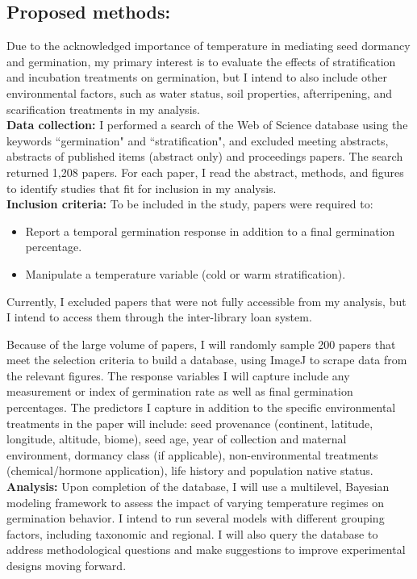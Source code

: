 \documentclass[12pt]{article}\usepackage[]{graphicx}\usepackage[]{color}
\begin{document}
\subsection*{Proposed methods:}
\indent\indent Due to the acknowledged importance of temperature in mediating seed dormancy and germination, my primary interest is to evaluate the effects of stratification and incubation treatments on germination, but I intend to also include other environmental factors, such as water status, soil properties, afterripening, and scarification treatments in my analysis.\\
\indent\textbf{Data collection:} I performed a search of the Web of Science database using the keywords ``germination" and ``stratification", and excluded meeting abstracts, abstracts of published items (abstract only) and proceedings papers. The search returned 1,208 papers. For each paper, I read the abstract, methods, and figures to identify studies that fit for inclusion in my analysis.\\
\indent\textbf{Inclusion criteria:} To be included in the study, papers were required to:
\begin{itemize}
\item Report a temporal germination response in addition to a final germination percentage.
\item Manipulate a temperature variable (cold or warm stratification).
\end{itemize}
Currently, I excluded papers that were not fully accessible from my analysis, but I intend to access them through the inter-library loan system. 
\par Because of the large volume of papers, I will randomly sample 200 papers that meet the selection criteria to build a database, using ImageJ to scrape data from the relevant figures. The response variables I will capture include any measurement or index of germination rate as well as final germination percentages. The predictors I capture in addition to the specific environmental treatments in the paper will include: seed provenance (continent, latitude, longitude, altitude, biome), seed age, year of collection and maternal environment, dormancy class (if applicable), non-environmental treatments (chemical/hormone application), life history and population native status.\\
\indent\indent\textbf{Analysis:} Upon completion of the database, I will use a multilevel, Bayesian modeling framework to assess the impact of varying temperature regimes on germination behavior. I intend to run several models with different grouping factors, including taxonomic and regional. I will also query the database to address methodological questions and make suggestions to improve experimental designs moving forward. 
\end{document}

